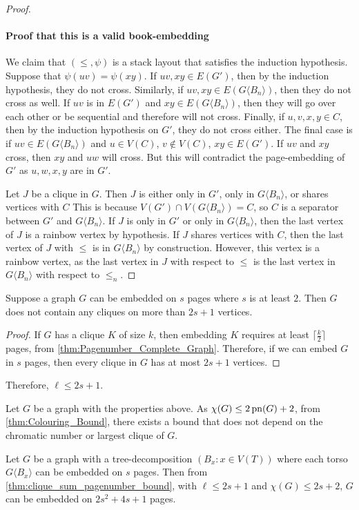 \begin{proof}
	\paragraph{Proof that this is a valid book-embedding}
	We claim that \((\leq , \psi)\) is a stack layout that satisfies the induction hypothesis. Suppose that \(\psi(uv) = \psi(xy)\). If \(uv, xy \in E(G')\), then by the induction hypothesis, they do not cross. Similarly, if \(uv, xy \in E(G \langle B_n \rangle)\), then they do not cross as well. If \(uv\) is in \(E(G')\) and \(xy \in E(G \langle B_n \rangle)\), then they will go over each other or be sequential and therefore will not cross.
	Finally, if \(u, v, x, y \in C\), then by the induction hypothesis on \(G'\), they do not cross either. The final case is if \(uv \in E(G\langle B_{n} \rangle)\) and \(u \in V(C)\), \(v \notin V(C)\), \(xy \in E(G')\). If \(uv\) and \(xy\) cross, then \(xy\) and \(uw\) will cross. But this will contradict the page-embedding of \(G'\) as $u, w, x, y$ are in $G'$.

	Let \(J\) be a clique in \(G\). Then $J$ is either only in $G'$, only in $G\langle B_n \rangle$, or shares vertices with $C$ This is because $V(G') \cap V(G\langle B_n \rangle) = C$, so $C$ is a separator between $G'$ and $G \langle B_n \rangle$. If $J$ is only in $G'$ or only in $G\langle B_n \rangle$, then the last vertex of $J$ is a rainbow vertex by hypothesis. If $J$ shares vertices with $C$, then the last vertex of $J$ with $\leq$ is in $G\langle B_n \rangle$ by construction. However, this vertex is a rainbow vertex, as the last vertex in $J$ with respect to $\leq$ is the last vertex in $G\langle B_n \rangle$ with respect to $\leq_n$. 
\end{proof}

\begin{lemma}
	Suppose a graph $G$ can be embedded on $s$ pages where $s$ is at least $2$. Then \(G\) does not contain any cliques on more than \(2s+1\) vertices.
\end{lemma}

\begin{proof}
	If \(G\) has a clique $K$ of size \(k\), then embedding $K$ requires at least \(\lceil \frac{k}{2} \rceil\) pages, from \cref{thm:Pagenumber_Complete_Graph}. Therefore, if we can embed \(G\) in \(s\) pages, then every clique in $G$ has at most \(2s + 1\) vertices.
\end{proof}
Therefore, \(\ell \leq 2s + 1\).

Let $G$ be a graph with the properties above. As \(\chi(G) \leq 2 \operatorname{pn}(G) + 2\), from \cref{thm:Colouring_Bound}, there exists a bound that does not depend on the chromatic number or largest clique of \(G\).
\begin{corollary}\label{corr:bded_pn_tree_decomp}
	Let \(G\) be a graph with a tree-decomposition \((B_x: x \in V(T))\) where each torso \(G \langle B_x \rangle\) can be embedded on $s$ pages. Then from \cref{thm:clique_sum_pagenumber_bound}, with $\ell \leq 2s + 1$ and $\chi(G) \leq 2 s + 2$, \(G\) can be embedded on \(2s^2 + 4s + 1\) pages.
\end{corollary}

